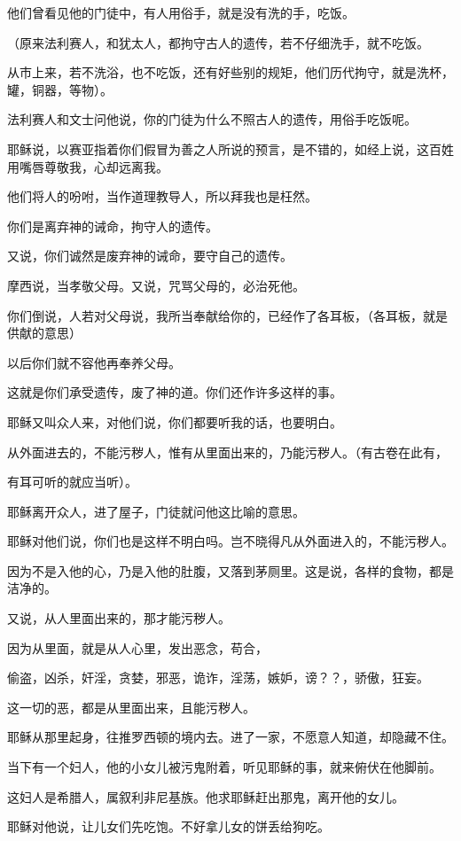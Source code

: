 \documentclass[12pt,oneside]{book}
\begin{document}
他们曾看见他的门徒中，有人用俗手，就是没有洗的手，吃饭。

（原来法利赛人，和犹太人，都拘守古人的遗传，若不仔细洗手，就不吃饭。

从市上来，若不洗浴，也不吃饭，还有好些别的规矩，他们历代拘守，就是洗杯，罐，铜器，等物）。

法利赛人和文士问他说，你的门徒为什么不照古人的遗传，用俗手吃饭呢。

耶稣说，以赛亚指着你们假冒为善之人所说的预言，是不错的，如经上说，这百姓用嘴唇尊敬我，心却远离我。

他们将人的吩咐，当作道理教导人，所以拜我也是枉然。

你们是离弃神的诫命，拘守人的遗传。

又说，你们诚然是废弃神的诫命，要守自己的遗传。

摩西说，当孝敬父母。又说，咒骂父母的，必治死他。

你们倒说，人若对父母说，我所当奉献给你的，已经作了各耳板，（各耳板，就是供献的意思）

以后你们就不容他再奉养父母。

这就是你们承受遗传，废了神的道。你们还作许多这样的事。

耶稣又叫众人来，对他们说，你们都要听我的话，也要明白。

从外面进去的，不能污秽人，惟有从里面出来的，乃能污秽人。（有古卷在此有，

有耳可听的就应当听）。

耶稣离开众人，进了屋子，门徒就问他这比喻的意思。

耶稣对他们说，你们也是这样不明白吗。岂不晓得凡从外面进入的，不能污秽人。

因为不是入他的心，乃是入他的肚腹，又落到茅厕里。这是说，各样的食物，都是洁净的。

又说，从人里面出来的，那才能污秽人。

因为从里面，就是从人心里，发出恶念，苟合，

偷盗，凶杀，奸淫，贪婪，邪恶，诡诈，淫荡，嫉妒，谤？？，骄傲，狂妄。

这一切的恶，都是从里面出来，且能污秽人。

耶稣从那里起身，往推罗西顿的境内去。进了一家，不愿意人知道，却隐藏不住。

当下有一个妇人，他的小女儿被污鬼附着，听见耶稣的事，就来俯伏在他脚前。

这妇人是希腊人，属叙利非尼基族。他求耶稣赶出那鬼，离开他的女儿。

耶稣对他说，让儿女们先吃饱。不好拿儿女的饼丢给狗吃。
\end{document}
